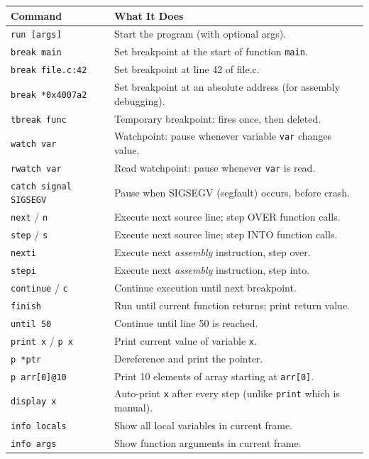 \documentclass[11pt,a4paper]{article}
\newcommand{\code}[1]{\texttt{\small\colorbox{codebg}{\color{codekw}#1}}}
\begin{document}
\begin{center}
\begin{longtable}{L{5cm} L{9cm}}
\toprule
\textbf{Command} & \textbf{What It Does} \\
\midrule
\code{run [args]} & Start the program (with optional args). \\
\code{break main} & Set breakpoint at the start of function \code{main}. \\
\code{break file.c:42} & Set breakpoint at line 42 of file.c. \\
\code{break *0x4007a2} & Set breakpoint at an absolute address (for assembly debugging). \\
\code{tbreak func} & Temporary breakpoint: fires once, then deleted. \\
\code{watch var} & Watchpoint: pause whenever variable \code{var} changes value. \\
\code{rwatch var} & Read watchpoint: pause whenever \code{var} is read. \\
\code{catch signal SIGSEGV} & Pause when SIGSEGV (segfault) occurs, before crash. \\
\code{next} / \code{n} & Execute next source line; step OVER function calls. \\
\code{step} / \code{s} & Execute next source line; step INTO function calls. \\
\code{nexti} & Execute next \textit{assembly} instruction, step over. \\
\code{stepi} & Execute next \textit{assembly} instruction, step into. \\
\code{continue} / \code{c} & Continue execution until next breakpoint. \\
\code{finish} & Run until current function returns; print return value. \\
\code{until 50} & Continue until line 50 is reached. \\
\code{print x} / \code{p x} & Print current value of variable \code{x}. \\
\code{p *ptr} & Dereference and print the pointer. \\
\code{p arr[0]@10} & Print 10 elements of array starting at \code{arr[0]}. \\
\code{display x} & Auto-print \code{x} after every step (unlike \code{print} which is manual). \\
\code{info locals} & Show all local variables in current frame. \\
\code{info args} & Show function arguments in current frame. \\

\end{longtable}
\end{center}
\end{document}
